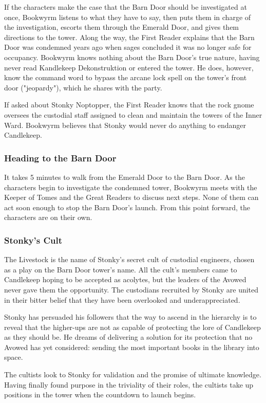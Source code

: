 \documentclass[10pt,a4paper,twoside,bg=print,twocolumn,openany,nodeprecatedcode]{dndbook}
\begin{document}
If the characters make the case that the Barn Door should be investigated at once, Bookwyrm listens to what they have to say, then puts them in charge of the investigation, escorts them through the Emerald Door, and gives them directions to the tower. Along the way, the First Reader explains that the Barn Door was condemned years ago when sages concluded it was no longer safe for occupancy. Bookwyrm knows nothing about the Barn Door's true nature, having never read Kandlekeep Dekonstruktion or entered the tower. He does, however, know the command word to bypass the arcane lock spell on the tower's front door ("jeopardy"), which he shares with the party.

If asked about Stonky Noptopper, the First Reader knows that the rock gnome oversees the custodial staff assigned to clean and maintain the towers of the Inner Ward. Bookwyrm believes that Stonky would never do anything to endanger Candlekeep.

\subsubsection{Heading to the Barn Door}
It takes 5 minutes to walk from the Emerald Door to the Barn Door. As the characters begin to investigate the condemned tower, Bookwyrm meets with the Keeper of Tomes and the Great Readers to discuss next steps. None of them can act soon enough to stop the Barn Door's launch. From this point forward, the characters are on their own.

\subsubsection{Stonky's Cult}
The Livestock is the name of Stonky's secret cult of custodial engineers, chosen as a play on the Barn Door tower's name. All the cult's members came to Candlekeep hoping to be accepted as acolytes, but the leaders of the Avowed never gave them the opportunity. The custodians recruited by Stonky are united in their bitter belief that they have been overlooked and underappreciated.

Stonky has persuaded his followers that the way to ascend in the hierarchy is to reveal that the higher-ups are not as capable of protecting the lore of Candlekeep as they should be. He dreams of delivering a solution for its protection that no Avowed has yet considered: sending the most important books in the library into space.

The cultists look to Stonky for validation and the promise of ultimate knowledge. Having finally found purpose in the triviality of their roles, the cultists take up positions in the tower when the countdown to launch begins.
\end{document}
